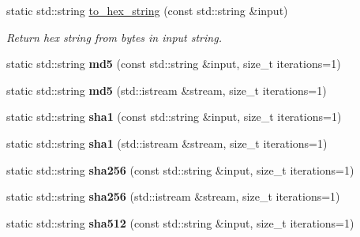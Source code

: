 \begin{DoxyCompactItemize}
\item 
\mbox{\label{class_simple_web_1_1_crypto_ab40abff25234f08b7b90fc97fab39faa}} 
static std\+::string \hyperlink{class_simple_web_1_1_crypto_ab40abff25234f08b7b90fc97fab39faa}{to\+\_\+hex\+\_\+string} (const std\+::string \&input)
\begin{DoxyCompactList}\small\item\em Return hex string from bytes in input string. \end{DoxyCompactList}\item 
\mbox{\label{class_simple_web_1_1_crypto_a0561dc11ae3cd68004bdb90e04252164}} 
static std\+::string {\bfseries md5} (const std\+::string \&input, size\+\_\+t iterations=1)
\item 
\mbox{\label{class_simple_web_1_1_crypto_a8fe52ed7463c99a9165a215831dc6127}} 
static std\+::string {\bfseries md5} (std\+::istream \&stream, size\+\_\+t iterations=1)
\item 
\mbox{\label{class_simple_web_1_1_crypto_a7c665ab1dc299e741a5e81f7cf33c523}} 
static std\+::string {\bfseries sha1} (const std\+::string \&input, size\+\_\+t iterations=1)
\item 
\mbox{\label{class_simple_web_1_1_crypto_a638b7c19084f34d88d696be9d9353e4e}} 
static std\+::string {\bfseries sha1} (std\+::istream \&stream, size\+\_\+t iterations=1)
\item 
\mbox{\label{class_simple_web_1_1_crypto_a85dc4f2bae2305fa6e8a34bf0f4f158d}} 
static std\+::string {\bfseries sha256} (const std\+::string \&input, size\+\_\+t iterations=1)
\item 
\mbox{\label{class_simple_web_1_1_crypto_a09d10275fef3ec75a698af4f27c5aac3}} 
static std\+::string {\bfseries sha256} (std\+::istream \&stream, size\+\_\+t iterations=1)
\item 
\mbox{\label{class_simple_web_1_1_crypto_adc77ea749230d6a7f299125c43966c34}} 
static std\+::string {\bfseries sha512} (const std\+::string \&input, size\+\_\+t iterations=1)

\end{DoxyCompactItemize}
